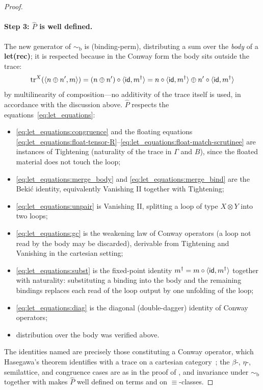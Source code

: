 \begin{proof}
\paragraph{Step 3: $\hat{P}$ is well defined.}
The new generator of $\sim_{\mathrm b}$ is (binding-perm), distributing a sum over the \emph{body} of a \textbf{let(rec)}; it is respected because in the Conway form the body sits outside the trace:
\[
\text{tr}^{X}(\langle n \mathbin{\oplus} n', m \rangle) = (n \mathbin{\oplus} n') \circ \langle \textsf{id}, m^{\dagger} \rangle = n \circ \langle \textsf{id}, m^{\dagger} \rangle \mathbin{\oplus} n' \circ \langle \textsf{id}, m^{\dagger} \rangle
\]
by multilinearity of composition---no additivity of the trace itself is used, in accordance with the discussion above.
$\hat{P}$ respects the equations~\eqref{eq:let_equations}:
\begin{itemize}
  \item \eqref{eq:let_equations:congruence} and the floating equations \eqref{eq:let_equations:float-tensor-R}--\eqref{eq:let_equations:float-match-scrutinee} are instances of Tightening (naturality of the trace in $\Gamma$ and $B$), since the floated material does not touch the loop;
  \item \eqref{eq:let_equations:merge_body} and \eqref{eq:let_equations:merge_bind} are the Beki\'{c} identity, equivalently Vanishing II together with Tightening;
  \item \eqref{eq:let_equations:unpair} is Vanishing II, splitting a loop of type $X \otimes Y$ into two loops;
  \item \eqref{eq:let_equations:gc} is the weakening law of Conway operators (a loop not read by the body may be discarded), derivable from Tightening and Vanishing in the cartesian setting;
  \item \eqref{eq:let_equations:subst} is the fixed-point identity $m^{\dagger} = m \circ \langle \textsf{id}, m^{\dagger} \rangle$ together with naturality: substituting a binding into the body and the remaining bindings replaces each read of the loop output by one unfolding of the loop;
  \item \eqref{eq:let_equations:diag} is the diagonal (double-dagger) identity of Conway operators;
  \item distribution over the body was verified above.
\end{itemize}
The identities named are precisely those constituting a Conway operator, which Hasegawa's theorem identifies with a trace on a cartesian category~\cite{hasegawa_models_1999}; the $\beta$-, $\eta$-, semilattice, and congruence cases are as in the proof of , and invariance under $\sim_{\mathrm b}$ together with  makes $\hat{P}$ well defined on terms and on $\equiv$-classes.


\end{proof}
